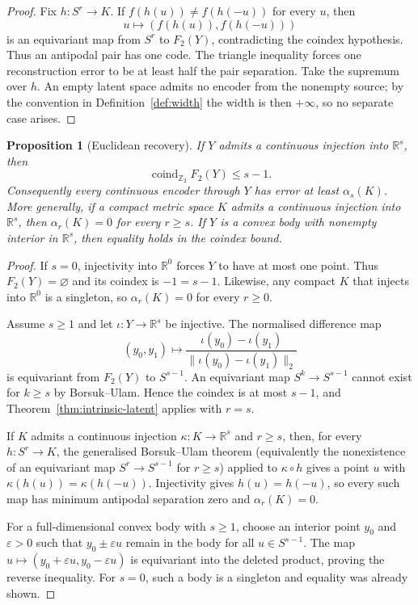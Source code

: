 \documentclass[11pt,a4paper]{article}
\theoremstyle{definition}
\theoremstyle{plain}
\newtheorem{proposition}[theorem]{Proposition}
\theoremstyle{remark}
\begin{document}
\begin{proof}
Fix $h:S^r\to K$. If $f(h(u))\neq f(h(-u))$ for every $u$, then
\[
u\longmapsto(f(h(u)),f(h(-u)))
\]
is an equivariant map from $S^r$ to $F_2(Y)$, contradicting the coindex
hypothesis. Thus an antipodal pair has one code. The triangle inequality
forces one reconstruction error to be at least half the pair separation.
Take the supremum over $h$. An empty latent space admits no encoder from
the nonempty source; by the convention in Definition~\ref{def:width} the
width is then $+\infty$, so no separate case arises.
\end{proof}

\begin{proposition}[Euclidean recovery]
\label{prop:euclidean-coindex}
If $Y$ admits a continuous injection into $\mathbb R^s$, then
\[
\operatorname{coind}_{\mathbb Z_2}F_2(Y)\leq s-1.
\]
Consequently every continuous encoder through $Y$ has error at least
$\alpha_s(K)$. More generally, if a compact metric space $K$ admits a
continuous injection into $\mathbb R^s$, then
$\alpha_r(K)=0$ for every $r\geq s$. If $Y$ is a convex body with
nonempty interior in $\mathbb R^s$, then equality holds in the coindex
bound.
\end{proposition}

\begin{proof}
If $s=0$, injectivity into $\mathbb R^0$ forces $Y$ to have at most one
point. Thus $F_2(Y)=\varnothing$ and its coindex is $-1=s-1$. Likewise,
any compact $K$ that injects into $\mathbb R^0$ is a singleton, so
$\alpha_r(K)=0$ for every $r\geq0$.

Assume $s\geq1$ and let $\iota:Y\to\mathbb R^s$ be injective. The
normalised difference map
\[
(y_0,y_1)\longmapsto
\frac{\iota(y_0)-\iota(y_1)}
     {\|\iota(y_0)-\iota(y_1)\|_2}
\]
is equivariant from $F_2(Y)$ to $S^{s-1}$. An equivariant map
$S^k\to S^{s-1}$ cannot exist for $k\geq s$ by Borsuk--Ulam. Hence the
coindex is at most $s-1$, and Theorem~\ref{thm:intrinsic-latent} applies
with $r=s$.

If $K$ admits a continuous injection $\kappa:K\to\mathbb R^s$ and
$r\geq s$, then, for every $h:S^r\to K$, the generalised Borsuk--Ulam theorem (equivalently the nonexistence of an equivariant map $S^r\to S^{s-1}$ for $r\ge s$) applied to $\kappa\circ h$ gives a point $u$ with
$\kappa(h(u))=\kappa(h(-u))$. Injectivity gives $h(u)=h(-u)$, so every
such map has minimum antipodal separation zero and $\alpha_r(K)=0$.

For a full-dimensional convex body with $s\geq1$, choose an interior point
$y_0$ and $\varepsilon>0$ such that $y_0\pm\varepsilon u$ remain in the
body for all $u\in S^{s-1}$. The map
$u\mapsto(y_0+\varepsilon u,y_0-\varepsilon u)$ is equivariant into the
deleted product, proving the reverse inequality. For $s=0$, such a body
is a singleton and equality was already shown.
\end{proof}
\end{document}
